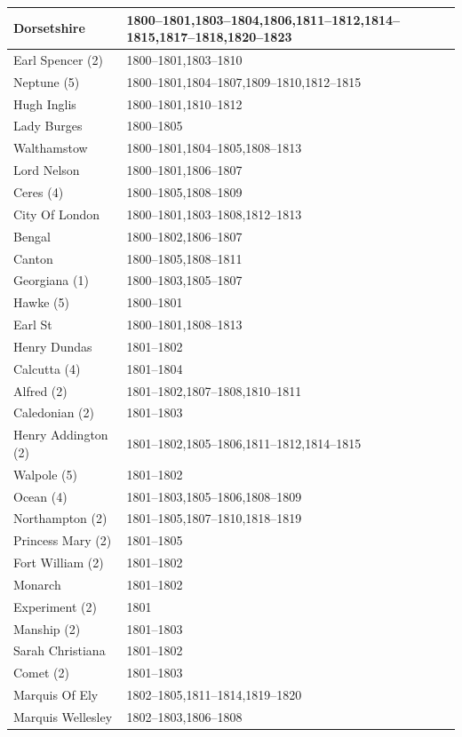 \documentclass[CP]{copernicus}
\begin{document}
\begin{table}[!hbp]
\begin{minipage}[b]{0.5\linewidth}
{\begin{tabular}{|p{3.5cm}|p{3.5cm}|}
\hline
Dorsetshire & 1800--1801,1803--1804,1806,1811--1812,1814--1815,1817--1818,1820--1823\\
\hline
Earl Spencer (2) & 1800--1801,1803--1810\\
\hline
Neptune (5) & 1800--1801,1804--1807,1809--1810,1812--1815\\
\hline
Hugh Inglis & 1800--1801,1810--1812\\
\hline
Lady Burges & 1800--1805\\
\hline
Walthamstow & 1800--1801,1804--1805,1808--1813\\
\hline
Lord Nelson & 1800--1801,1806--1807\\
\hline
Ceres (4) & 1800--1805,1808--1809\\
\hline
City Of London & 1800--1801,1803--1808,1812--1813\\
\hline
Bengal & 1800--1802,1806--1807\\
\hline
Canton & 1800--1805,1808--1811\\
\hline
Georgiana (1) & 1800--1803,1805--1807\\
\hline
Hawke (5) & 1800--1801\\
\hline
Earl St & 1800--1801,1808--1813\\
\hline
Henry Dundas & 1801--1802\\
\hline
Calcutta (4) & 1801--1804\\
\hline
Alfred (2) & 1801--1802,1807--1808,1810--1811\\
\hline
Caledonian (2) & 1801--1803\\
\hline
Henry Addington (2) & 1801--1802,1805--1806,1811--1812,1814--1815\\
\hline
Walpole (5) & 1801--1802\\
\hline
Ocean (4) & 1801--1803,1805--1806,1808--1809\\
\hline
Northampton (2) & 1801--1805,1807--1810,1818--1819\\
\hline
Princess Mary (2) & 1801--1805\\
\hline
Fort William (2) & 1801--1802\\
\hline
Monarch & 1801--1802\\
\hline
Experiment (2) & 1801\\
\hline
Manship (2) & 1801--1803\\
\hline
Sarah Christiana & 1801--1802\\
\hline
Comet (2) & 1801--1803\\
\hline
Marquis Of Ely & 1802--1805,1811--1814,1819--1820\\
\hline
Marquis Wellesley & 1802--1803,1806--1808\\

\end{tabular}}
\end{minipage}
\end{table}
\end{document}
